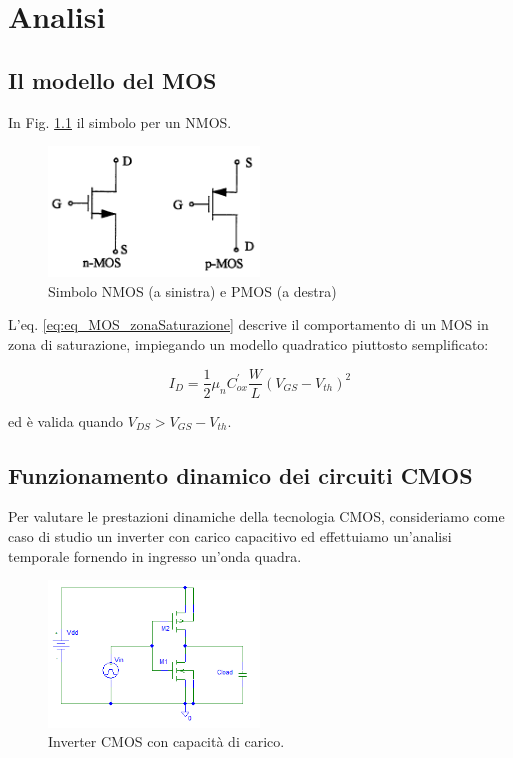 
\chapter{Analisi} %
\label{Chapter2}

\section{Il modello del MOS}
\label{sec:sec_mos}

In Fig. \ref{fig:simboliMos} il simbolo per un NMOS.

\begin{figure}[hbt!]
	\centering
	\includegraphics[width=0.5\textwidth]{figure/simboliMos.png}
	\caption{Simbolo NMOS (a sinistra) e PMOS (a destra)}
	\label{fig:simboliMos}
\end{figure}

L'eq. \ref{eq:eq_MOS_zonaSaturazione} descrive il comportamento di un MOS in zona di saturazione, impiegando un modello quadratico piuttosto semplificato:

\begin{equation}
	I_{D} = \frac{1}{2} \mu _{n} C^{'}_{ox} \frac{W}{L} (V_{GS}-V_{th})^2
	\label{eq:eq_MOS_zonaSaturazione}
\end{equation}

ed è valida quando $V_{DS} > V_{GS}-V_{th}$.

\section{Funzionamento dinamico dei circuiti CMOS}

Per valutare le prestazioni dinamiche della tecnologia CMOS, consideriamo come caso di studio un inverter con carico capacitivo ed effettuiamo un'analisi temporale fornendo in ingresso un'onda quadra.

\begin{figure}[hbt!]
	\centering
	\includegraphics[width=0.5\textwidth]{figure/Sch_InverterCMOS.PNG}
	\caption{Inverter CMOS con capacità di carico.}
	\label{fig:fig_sch_inverterCMOS}
\end{figure}

